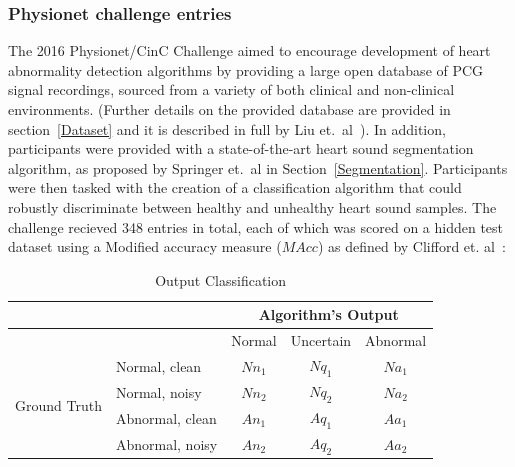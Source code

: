 \documentclass[titlepage, 12pt]{scrartcl} \usepackage{enumitem}
\begin{document}
\subsubsection{Physionet challenge entries}
\doublespacing
The 2016 Physionet/CinC Challenge aimed to encourage development of heart
abnormality detection algorithms by providing a large open database of PCG
signal recordings, sourced from a variety of both clinical and non-clinical
environments. (Further details on the provided database are provided in
section~\ref{Dataset} and it is described in full by Liu et.\
al~\citeyearpar{Liu2016}). In addition, participants were provided with a
state-of-the-art heart sound segmentation algorithm, as proposed by Springer
et.\ al in Section~\ref{Segmentation}. Participants were then tasked with the
creation of a classification algorithm that could robustly discriminate between
healthy and unhealthy heart sound samples. The challenge recieved 348 entries
in total, each of which was scored on a hidden test dataset
using a Modified accuracy measure ($MAcc$) as defined by Clifford et.
al~\citeyearpar{Clifford2016}:
\begin{table}[H]
\centering
\caption{Output Classification}
\label{OutputClassification}
\doublespacing
\begin{tabular}{llccc}
\hline
                              &                 & \multicolumn{3}{c}{Algorithm's Output}                                                    \\ \hline
                              &                 & \multicolumn{1}{l}{Normal} & \multicolumn{1}{l}{Uncertain} & \multicolumn{1}{l}{Abnormal} \\
\multirow{4}{*}{Ground Truth} & Normal, clean   & $Nn_1$                     & $Nq_1$                        & $Na_1$                       \\
                              & Normal, noisy   & $Nn_2$                     & $Nq_2$                        & $Na_2$                       \\
                              & Abnormal, clean & $An_1$                     & $Aq_1$                        & $Aa_1$                       \\
                              & Abnormal, noisy & $An_2$                     & $Aq_2$                        & $Aa_2$                       \\ \hline
\end{tabular}
\end{table}

\doublespacing
\end{document}
